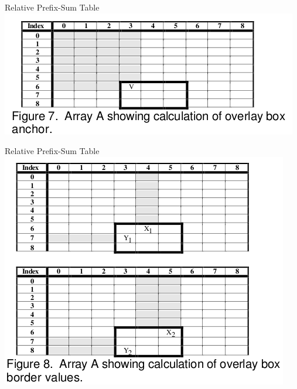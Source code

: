 \documentclass{beamer}
\theoremstyle{definition}
\theoremstyle{definition}
\begin{document}
\begin{frame}{Relative Prefix-Sum Table}
\includegraphics[scale=0.35]{relprefix_anchor.png}
\cite{Geffner99}
\end{frame}

\begin{frame}{Relative Prefix-Sum Table}
\includegraphics[scale=0.35]{relprefix_outer.png}
\cite{Geffner99}
\end{frame}
\end{document}
